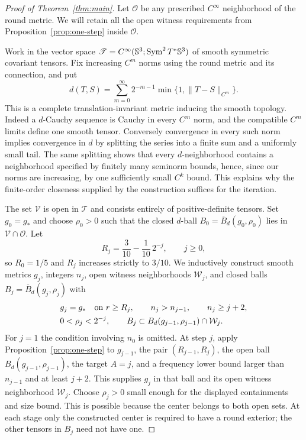 \begin{proof}[Proof of Theorem~\ref{thm:main}]
Let $\mathcal O$ be any prescribed $C^\infty$ neighborhood of the
round metric.  We will retain all the open witness requirements from
Proposition~\ref{prop:one-step} inside $\mathcal O$.

Work in the vector space
$\mathscr T=C^\infty(\mathbb S^3;\operatorname{Sym}^2T^*\mathbb S^3)$ of smooth
symmetric covariant tensors.  Fix increasing $C^m$ norms using the
round metric and its connection, and put
\begin{equation}\label{eq:complete-tensor-metric}
 d(T,S)=\sum_{m=0}^\infty 2^{-m-1}
       \min\{1,\|T-S\|_{C^m}\}.
\end{equation}
This is a complete translation-invariant metric inducing the smooth
topology.  Indeed a $d$-Cauchy sequence is Cauchy in every $C^m$
norm, and the compatible $C^m$ limits define one smooth tensor.
Conversely convergence in every such norm implies convergence in
$d$ by splitting the series into a finite sum and a uniformly small
tail.  The same splitting shows that every $d$-neighborhood contains
a neighborhood specified by finitely many seminorm bounds, hence,
since our norms are increasing, by one sufficiently small $C^k$
bound.  This explains why the finite-order closeness supplied by the
construction suffices for the iteration.

The set $\mathcal V$ is open in $\mathscr T$ and consists entirely
of positive-definite tensors.  Set $g_0=g_*$ and choose
$\rho_0>0$ such that the closed $d$-ball
$B_0=\overline B_d(g_0,\rho_0)$ lies in
$\mathcal V\cap\mathcal O$.  Let
\[
 R_j=\frac3{10}-\frac1{10}\,2^{-j},\qquad j\ge0,
\]
so $R_0=1/5$ and $R_j$ increases strictly to $3/10$.
We inductively construct smooth metrics $g_j$, integers $n_j$, open
witness neighborhoods $\mathcal W_j$, and closed balls
$B_j=\overline B_d(g_j,\rho_j)$ with
\begin{align*}
 &g_j=g_*\quad\hbox{on }r\ge R_j,\qquad n_j>n_{j-1},\qquad n_j\ge j+2,\\
 &0<\rho_j<2^{-j},\qquad
 B_j\subset B_d(g_{j-1},\rho_{j-1})\cap\mathcal W_j.
\end{align*}
For $j=1$ the condition involving $n_0$ is omitted.
At step $j$, apply Proposition~\ref{prop:one-step} to $g_{j-1}$,
the pair $(R_{j-1},R_j)$, the open ball
$B_d(g_{j-1},\rho_{j-1})$, the target $A=j$, and a frequency lower
bound larger than $n_{j-1}$ and at least $j+2$.
This supplies $g_j$ in that ball and its open witness neighborhood
$\mathcal W_j$.  Choose $\rho_j>0$ small enough for the displayed
containments and size bound.  This is possible because the center
belongs to both open sets.  At each stage only the constructed center
is required to have a round exterior; the other tensors in $B_j$
need not have one.


\end{proof}
